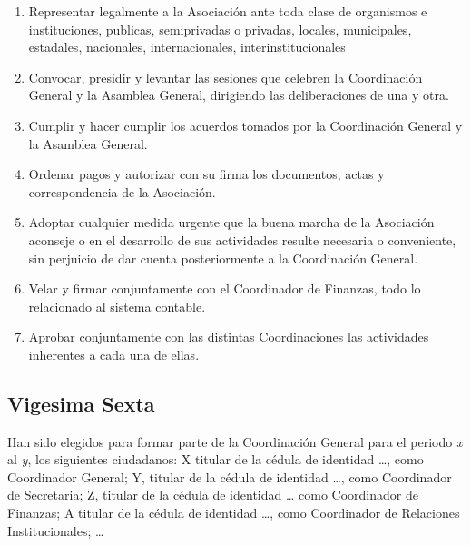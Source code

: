         \begin{enumerate}
          \item
            Representar legalmente a la Asociaci\'on ante toda clase de
            organismos e instituciones, publicas, semiprivadas o privadas,
            locales, municipales, estadales, nacionales, internacionales,
            interinstitucionales 
          
          \item
            Convocar, presidir y levantar las sesiones que celebren la
            Coordinaci\'on General y la Asamblea General, dirigiendo las
            deliberaciones de una y otra. 
          
          \item
            Cumplir y hacer cumplir los acuerdos tomados por la Coordinaci\'on
            General y la Asamblea General. 
            
          \item
            Ordenar pagos y autorizar con su firma los documentos, actas y
            correspondencia de la Asociaci\'on. 
            
          \item
            Adoptar cualquier medida urgente que la buena marcha de la
            Asociaci\'on aconseje o en el desarrollo de sus actividades resulte
            necesaria o conveniente, sin perjuicio de dar cuenta posteriormente
            a la Coordinaci\'on General. 
      
          \item
            Velar y firmar conjuntamente con el Coordinador de Finanzas, todo lo
            relacionado al sistema contable.  
      
          \item
            Aprobar conjuntamente con las distintas Coordinaciones las
            actividades inherentes a cada una de ellas.

        \end{enumerate}

    \subsection{Vigesima Sexta}
      Han sido elegidos para formar parte de la Coordinaci\'on General para el
      periodo \emph{x} al \emph{y}, los siguientes ciudadanos: X titular de la
      c\'edula de identidad \textnumero \ldots, como Coordinador General; Y,
      titular de la c\'edula de identidad \textnumero \ldots, como Coordinador
      de Secretaria; Z, titular de la c\'edula de identidad \textnumero \ldots
      como Coordinador de Finanzas; A titular de la c\'edula de identidad
      \textnumero \ldots, como Coordinador de Relaciones Institucionales; \ldots
